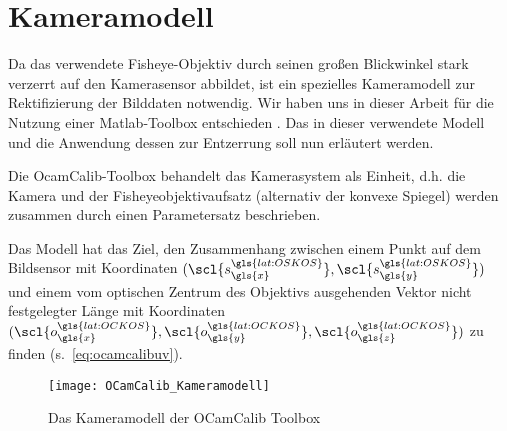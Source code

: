 \section{Kameramodell} \label{sec:kameramodell}
Da das verwendete Fisheye-Objektiv durch seinen großen Blickwinkel stark verzerrt auf den Kamerasensor abbildet, ist ein spezielles Kameramodell zur Rektifizierung der Bilddaten notwendig. Wir haben uns in dieser Arbeit für die Nutzung einer Matlab-Toolbox entschieden  \autocite{OCamCalibOmnidirectionalCamera, scaramuzzaFlexibleTechniqueAccurate2006, scaramuzzaToolboxEasilyCalibrating2006, scaramuzzaOmnidirectionalVisionCalibration2007, rufliAutomaticDetectionCheckerboards2008}. Das in dieser verwendete Modell und die Anwendung dessen zur Entzerrung soll nun erläutert werden. 

Die OcamCalib-Toolbox behandelt das Kamerasystem als Einheit, d.h. die Kamera und der Fisheyeobjektivaufsatz (alternativ der konvexe Spiegel) werden zusammen durch einen Parametersatz beschrieben.

Das Modell hat das Ziel, den Zusammenhang zwischen einem Punkt auf dem Bildsensor  mit Koordinaten \((\scl{s^{\gls{lat:OSKOS}}_{\gls{x}}}, \scl{s^{\gls{lat:OSKOS}}_{\gls{y}}})\) und einem vom optischen Zentrum des Objektivs ausgehenden Vektor nicht festgelegter Länge  mit Koordinaten \((\scl{o^{\gls{lat:OCKOS}}_{\gls{x}}}, \scl{o^{\gls{lat:OCKOS}}_{\gls{y}}}, \scl{o^{\gls{lat:OCKOS}}_{\gls{z}}})\) zu finden (s.~\eqref{eq:ocamcalibuv}).

\begin{figure}[H]
  \centering
  \texttt{[image: OCamCalib\_Kameramodell]}
  \caption{Das Kameramodell der OCamCalib Toolbox}
  \label{fig:kameramodell}
\end{figure}

